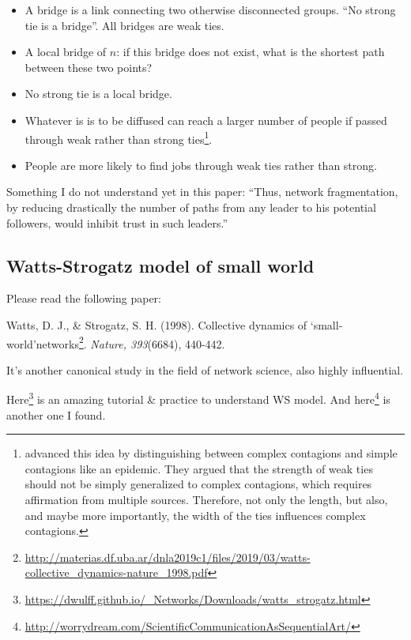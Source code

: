 \documentclass[
]{krantz}
\makeatletter
\renewcommand{\href}[2]{#2\footnote{\url{#1}}}
\newenvironment{kframe}{%
\medskip{}
\setlength{\fboxsep}{.8em}
 \def\at@end@of@kframe{}%
 \ifinner\ifhmode%
  \def\at@end@of@kframe{\end{minipage}}%
  \begin{minipage}{\columnwidth}%
 \fi\fi%
 \def\FrameCommand##1{\hskip\@totalleftmargin \hskip-\fboxsep
 \colorbox{shadecolor}{##1}\hskip-\fboxsep
     \hskip-\linewidth \hskip-\@totalleftmargin \hskip\columnwidth}%
 \MakeFramed {\advance\hsize-\width
   \@totalleftmargin\z@ \linewidth\hsize
   \@setminipage}}%
 {\par\unskip\endMakeFramed%
 \at@end@of@kframe}
\newenvironment{rmdblock}[1]
  {
  \begin{itemize}
  \renewcommand{\labelitemi}{
    \raisebox{-.7\height}[0pt][0pt]{
      {\setkeys{Gin}{width=3em,keepaspectratio}\texttt{[image: images/\#1]}}
    }
  }
  \setlength{\fboxsep}{1em}
  \begin{kframe}
  \item
  }
  {
  \end{kframe}
  \end{itemize}
  }
\newenvironment{rmdreminder}
  {\begin{rmdblock}{reminder}}
  {\end{rmdblock}}
\makeatother
\begin{document}
\begin{itemize}
\item
  A bridge is a link connecting two otherwise disconnected groups. ``No strong tie is a bridge''. All bridges are weak ties.
\item
  A local bridge of \(n\): if this bridge does not exist, what is the shortest path between these two points?
\item
  No strong tie is a local bridge.
\item
  Whatever is is to be diffused can reach a larger number of people if passed through weak rather than strong ties\footnote{\citet{centola2007complex} advanced this idea by distinguishing between complex contagions and simple contagions like an epidemic. They argued that the strength of weak ties should not be simply generalized to complex contagions, which requires affirmation from multiple sources. Therefore, not only the length, but also, and maybe more importantly, the width of the ties influences complex contagions.}.
\item
  People are more likely to find jobs through weak ties rather than strong.
\end{itemize}

\begin{rmdreminder}
Something I do not understand yet in this paper:
``Thus, network fragmentation, by reducing drastically the number of paths from any leader to his potential followers, would inhibit trust in such leaders.''
\end{rmdreminder}

\hypertarget{watts-strogatz-model-of-small-world}{%
\subsection{Watts-Strogatz model of small world}\label{watts-strogatz-model-of-small-world}}

Please read the following paper:

Watts, D. J., \& Strogatz, S. H. (1998). \href{http://materias.df.uba.ar/dnla2019c1/files/2019/03/watts-collective_dynamics-nature_1998.pdf}{Collective dynamics of `small-world'networks}. \emph{Nature, 393}(6684), 440-442.

It's another canonical study in the field of network science, also highly influential.

\href{https://dwulff.github.io/_Networks/Downloads/watts_strogatz.html}{Here} is an amazing tutorial \& practice to understand WS model. And \href{http://worrydream.com/ScientificCommunicationAsSequentialArt/}{here} is another one I found.
\end{document}
